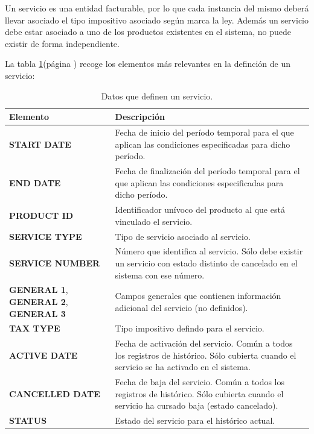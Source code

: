 Un servicio es una entidad facturable, por lo que cada instancia del mismo deberá llevar asociado el tipo impositivo asociado según marca la ley. Además un servicio debe estar asociado a uno de los productos existentes en el sistema, no puede existir de forma independiente.


La tabla \ref{tab:servicio}(página \pageref{tab:servicio}) recoge los elementos más relevantes en la definción de un servicio:

\begin{table}[H]
  \centering
  \setlength{\leftmargini}{0.4cm}
  \resizebox{14cm}{!} {
  \begin{tabular}{|m{6cm} m{8cm}|}
  \rowcolor{udcpink!25}
  \hline
  	\textbf{Elemento} & \textbf{Descripción} \\\hline
  	\textbf{START DATE} & Fecha de inicio del período temporal para el que aplican las condiciones especificadas para dicho período.\\
  	\textbf{END DATE} & Fecha de finalización del período temporal para el que aplican las condiciones especificadas para dicho período.\\
	\textbf{PRODUCT ID} & Identificador unívoco del producto al que está vinculado el servicio.\\
	\textbf{SERVICE TYPE} & Tipo de servicio asociado al servicio.\\
	\textbf{SERVICE NUMBER} & Número que identifica al servicio. Sólo debe existir un servicio con estado distinto de cancelado en el sistema con ese número.\\
	\textbf{GENERAL 1}, \textbf{GENERAL 2}, \textbf{GENERAL 3} & Campos generales que contienen información adicional del servicio (no definidos).\\	
	\textbf{TAX TYPE} & Tipo impositivo defindo para el servicio.\\
	\textbf{ACTIVE DATE} & Fecha de activación del servicio. Común a todos los registros de histórico. Sólo cubierta cuando el servicio se ha activado en el sistema.\\	
	\textbf{CANCELLED DATE} & Fecha de baja del servicio. Común a todos los registros de histórico. Sólo cubierta cuando el servicio ha cursado baja (estado cancelado).	\\
	\textbf{STATUS} & Estado del servicio para el histórico actual.	
	\\\hline
  \end{tabular}
  } %
  \caption{Datos que definen un servicio.}
  \label{tab:servicio}
\end{table}



